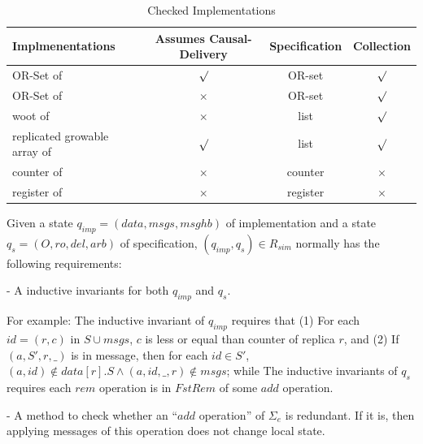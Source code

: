 \begin{table}[h]
	\centering
	\begin{tabular}{|l|c|c|c|}\hline
        Implmenentations&Assumes Causal-Delivery&Specification&Collection\\\hline
		OR-Set of \cite{Shapiro:2011} &  $\surd$ & OR-set & $\surd$\\
		OR-Set of \cite{Bieniusa:2012} & $\times$ & OR-set & $\surd$\\
        woot of \cite{Oster:2006} & $\times$ & list & $\surd$\\ 
        replicated growable array of \cite{Attiya:2016} & $\surd$ & list & $\surd$\\ 
        counter of \cite{Shapiro:2011} &  $\times$ & counter & $\times$\\ 
        register of \cite{Shapiro:2011} &  $\times$ & register & $\times$\\\hline 
	\end{tabular}
	\caption{Checked Implementations}
	\label{tab:checked implementations}
\end{table} 

Given a state $q_{\mathit{imp}} = (\mathit{data},\mathit{msgs},\mathit{msghb})$ of implementation and a state $q_s = (O,\mathit{ro},\mathit{del},\mathit{arb})$ of specification, $(q_{\mathit{imp}},q_s) \in R_{\mathit{sim}}$ normally has the following requirements:

\noindent - A inductive invariants for both $q_{\mathit{imp}}$ and $q_s$. %

For example: The inductive invariant of $q_{\mathit{imp}}$ requires that (1) For each $\mathit{id} = (r,c)$ in $S \cup \mathit{msgs}$, $c$ is less or equal than counter of replica $r$, and (2) If $(a,S',r,\_)$ is in message, then for each $\mathit{id} \in S'$, $(a,\mathit{id}) \notin \mathit{data}[r].S \wedge (a,\mathit{id},\_,r) \notin \mathit{msgs}$; while The inductive invariants of $q_s$ requires each $\mathit{rem}$ operation is in $\mathit{FstRem}$ of some $\mathit{add}$ operation. 

\noindent - A method to check whether an ``$\mathit{add}$ operation'' of $\Sigma_e$ is redundant. If it is, then applying messages of this operation does not change local state.

